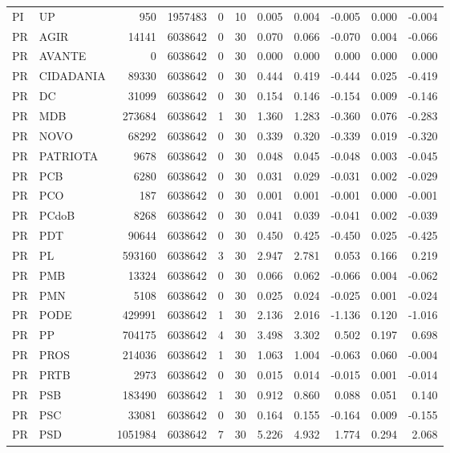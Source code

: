 \begin{landscape}
\begin{longtable}{llrrrrrrrrr}
PI & UP & 950 & 1957483 & 0 & 10 & 0.005 & 0.004 & -0.005 & 0.000 & -0.004 \\
PR & AGIR & 14141 & 6038642 & 0 & 30 & 0.070 & 0.066 & -0.070 & 0.004 & -0.066 \\
PR & AVANTE & 0 & 6038642 & 0 & 30 & 0.000 & 0.000 & 0.000 & 0.000 & 0.000 \\
PR & CIDADANIA & 89330 & 6038642 & 0 & 30 & 0.444 & 0.419 & -0.444 & 0.025 & -0.419 \\
PR & DC & 31099 & 6038642 & 0 & 30 & 0.154 & 0.146 & -0.154 & 0.009 & -0.146 \\
PR & MDB & 273684 & 6038642 & 1 & 30 & 1.360 & 1.283 & -0.360 & 0.076 & -0.283 \\
PR & NOVO & 68292 & 6038642 & 0 & 30 & 0.339 & 0.320 & -0.339 & 0.019 & -0.320 \\
PR & PATRIOTA & 9678 & 6038642 & 0 & 30 & 0.048 & 0.045 & -0.048 & 0.003 & -0.045 \\
PR & PCB & 6280 & 6038642 & 0 & 30 & 0.031 & 0.029 & -0.031 & 0.002 & -0.029 \\
PR & PCO & 187 & 6038642 & 0 & 30 & 0.001 & 0.001 & -0.001 & 0.000 & -0.001 \\
PR & PCdoB & 8268 & 6038642 & 0 & 30 & 0.041 & 0.039 & -0.041 & 0.002 & -0.039 \\
PR & PDT & 90644 & 6038642 & 0 & 30 & 0.450 & 0.425 & -0.450 & 0.025 & -0.425 \\
PR & PL & 593160 & 6038642 & 3 & 30 & 2.947 & 2.781 & 0.053 & 0.166 & 0.219 \\
PR & PMB & 13324 & 6038642 & 0 & 30 & 0.066 & 0.062 & -0.066 & 0.004 & -0.062 \\
PR & PMN & 5108 & 6038642 & 0 & 30 & 0.025 & 0.024 & -0.025 & 0.001 & -0.024 \\
PR & PODE & 429991 & 6038642 & 1 & 30 & 2.136 & 2.016 & -1.136 & 0.120 & -1.016 \\
PR & PP & 704175 & 6038642 & 4 & 30 & 3.498 & 3.302 & 0.502 & 0.197 & 0.698 \\
PR & PROS & 214036 & 6038642 & 1 & 30 & 1.063 & 1.004 & -0.063 & 0.060 & -0.004 \\
PR & PRTB & 2973 & 6038642 & 0 & 30 & 0.015 & 0.014 & -0.015 & 0.001 & -0.014 \\
PR & PSB & 183490 & 6038642 & 1 & 30 & 0.912 & 0.860 & 0.088 & 0.051 & 0.140 \\
PR & PSC & 33081 & 6038642 & 0 & 30 & 0.164 & 0.155 & -0.164 & 0.009 & -0.155 \\
PR & PSD & 1051984 & 6038642 & 7 & 30 & 5.226 & 4.932 & 1.774 & 0.294 & 2.068 \\

\end{longtable}
\end{landscape}
